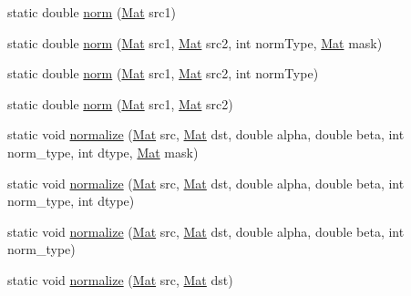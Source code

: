 \begin{DoxyCompactItemize}
\item 
static double \mbox{\hyperlink{classorg_1_1opencv_1_1core_1_1_core_a3ba2adc811656da873ceecb3c4c70335}{norm}} (\mbox{\hyperlink{classorg_1_1opencv_1_1core_1_1_mat}{Mat}} src1)
\item 
static double \mbox{\hyperlink{classorg_1_1opencv_1_1core_1_1_core_a23c3e3b3fa55f87f23805428dde2a157}{norm}} (\mbox{\hyperlink{classorg_1_1opencv_1_1core_1_1_mat}{Mat}} src1, \mbox{\hyperlink{classorg_1_1opencv_1_1core_1_1_mat}{Mat}} src2, int norm\+Type, \mbox{\hyperlink{classorg_1_1opencv_1_1core_1_1_mat}{Mat}} mask)
\item 
static double \mbox{\hyperlink{classorg_1_1opencv_1_1core_1_1_core_a9701be26bf1d6b0266034f83a7f85535}{norm}} (\mbox{\hyperlink{classorg_1_1opencv_1_1core_1_1_mat}{Mat}} src1, \mbox{\hyperlink{classorg_1_1opencv_1_1core_1_1_mat}{Mat}} src2, int norm\+Type)
\item 
static double \mbox{\hyperlink{classorg_1_1opencv_1_1core_1_1_core_a94edbb7146566314b150cb3434db8dfa}{norm}} (\mbox{\hyperlink{classorg_1_1opencv_1_1core_1_1_mat}{Mat}} src1, \mbox{\hyperlink{classorg_1_1opencv_1_1core_1_1_mat}{Mat}} src2)
\item 
static void \mbox{\hyperlink{classorg_1_1opencv_1_1core_1_1_core_a10833c4c941f13d93e3c5e702efa482e}{normalize}} (\mbox{\hyperlink{classorg_1_1opencv_1_1core_1_1_mat}{Mat}} src, \mbox{\hyperlink{classorg_1_1opencv_1_1core_1_1_mat}{Mat}} dst, double alpha, double beta, int norm\+\_\+type, int dtype, \mbox{\hyperlink{classorg_1_1opencv_1_1core_1_1_mat}{Mat}} mask)
\item 
static void \mbox{\hyperlink{classorg_1_1opencv_1_1core_1_1_core_a339332679c8e7d52cc2e1bba2187b8ff}{normalize}} (\mbox{\hyperlink{classorg_1_1opencv_1_1core_1_1_mat}{Mat}} src, \mbox{\hyperlink{classorg_1_1opencv_1_1core_1_1_mat}{Mat}} dst, double alpha, double beta, int norm\+\_\+type, int dtype)
\item 
static void \mbox{\hyperlink{classorg_1_1opencv_1_1core_1_1_core_af2e92f82c3f412aa25d1065065d07afe}{normalize}} (\mbox{\hyperlink{classorg_1_1opencv_1_1core_1_1_mat}{Mat}} src, \mbox{\hyperlink{classorg_1_1opencv_1_1core_1_1_mat}{Mat}} dst, double alpha, double beta, int norm\+\_\+type)
\item 
static void \mbox{\hyperlink{classorg_1_1opencv_1_1core_1_1_core_a659f5c8fc2f3d5ee432879bf968f6743}{normalize}} (\mbox{\hyperlink{classorg_1_1opencv_1_1core_1_1_mat}{Mat}} src, \mbox{\hyperlink{classorg_1_1opencv_1_1core_1_1_mat}{Mat}} dst)
\item 

\end{DoxyCompactItemize}
